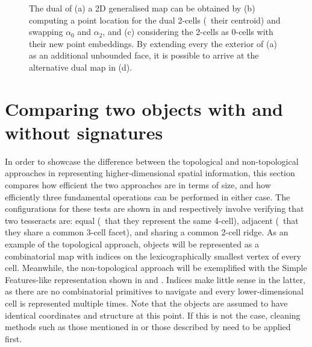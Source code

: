 \begin{figure}[tb]
{\label{subfig:dual_gmap3}}
\caption[A 2D generalised map and its dual]{The dual of (a) a 2D generalised map can be obtained by (b) computing a point location for the dual 2-cells (\eg\ their centroid) and swapping $\alpha_0$ and $\alpha_2$, and (c) considering the 2-cells as 0-cells with their new point embeddings.
By extending every the exterior of (a) as an additional unbounded face, it is possible to arrive at the alternative dual map in (d).}
\label{fig:dual_gmap}
\end{figure}

\section{Comparing two objects with and without signatures}
\label{se:ndqueries}

In order to showcase the difference between the topological and non-topological approaches in representing higher-dimensional spatial information, this section compares how efficient the two approaches are in terms of size, and how efficiently three fundamental operations can be performed in either case.
The configurations for these tests are shown in  and respectively involve verifying that two tesseracts are: equal (\ie\ that they represent the same 4-cell), adjacent (\ie\ that they share a common 3-cell facet), and sharing a common 2-cell ridge.
As an example of the topological approach, objects will be represented as a combinatorial map with indices on the lexicographically smallest vertex of every cell.
Meanwhile, the non-topological approach will be exemplified with the Simple Features-like \citep{SimpleFeatures1} representation shown in  and .
Indices make little sense in the latter, as there are no combinatorial primitives to navigate and every lower-dimensional cell is represented multiple times.
Note that the objects are assumed to have identical coordinates and structure at this point.
If this is not the case, cleaning methods such as those mentioned in  or those described by \citet{Diakite14} need to be applied first.

